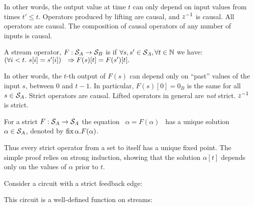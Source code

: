 \noindent
In other words, the output value at time $t$ can only depend on
input values from times $t' \leq t$.
Operators produced by lifting are causal, and $z^{-1}$ is causal.
All \dbsp operators are causal.  The composition
of causal operators of any number of inputs is causal.

\begin{definition}[Strictness]
A stream operator, $F:\mathcal{S}_{A}\to\mathcal{S}_{B}$
is 
if  $\forall s,s'\in\mathcal{S}_{A}, \forall t \in \mathbb{N}$ we have:
$(\forall i<t . ~s[i]=s'[i]) ~~\Rightarrow \\ F(s)[t]=F(s')[t].$
\end{definition}

In other words, the $t$-th output of $F(s)$ can depend only on ``past'' values
of the input $s$, between $0$ and $t-1$.
In particular, $F(s)[0] = 0_B$ is the same for all $s \in \mathcal{S}_{A}$.
Strict operators are causal. Lifted operators in general are \emph{not} strict.
$z^{-1}$ is strict.  %

\begin{proposition}
\label{prop-unique-fix}
For a strict $F: \mathcal{S}_{A} \to \mathcal{S}_{A}$ the equation ~$\alpha=F(\alpha)$~ has a unique
solution $\alpha \in \mathcal{S}_{A}$, denoted by $\mbox{fix}\,\alpha.F(\alpha)$.
\end{proposition}

Thus every strict operator from a set to itself has a unique fixed
point.  The simple proof relies on strong induction, showing that the
solution $\alpha[t]$ depends only on the values of $\alpha$ prior to
$t$.

Consider a circuit with a strict feedback edge:
\begin{center}
\end{center}

This circuit is a well-defined function on streams:



